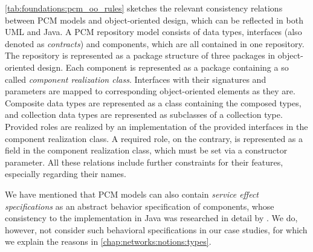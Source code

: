 \autoref{tab:foundations:pcm_oo_rules} sketches the relevant consistency relations between \gls{PCM} models and object-oriented design, which can be reflected in both \gls{UML} and Java.
A \gls{PCM} repository model consists of data types, interfaces (also denoted as \emph{contracts}) and components, which are all contained in one repository.
The repository is represented as a package structure of three packages in object-oriented design.
Each component is represented as a package containing a so called \emph{component realization class}.
Interfaces with their signatures and parameters are mapped to corresponding object-oriented elements as they are.
Composite data types are represented as a class containing the composed types, and collection data types are represented as subclasses of a collection type.
Provided roles are realized by an implementation of the provided interfaces in the component realization class.
A required role, on the contrary, is represented as a field in the component realization class, which must be set via a constructor parameter.
All these relations include further constraints for their features, especially regarding their names. %

We have mentioned that \gls{PCM} models can also contain \emph{service effect specifications} as an abstract behavior specification of components, whose consistency to the implementation in Java was researched in detail by \textcite{langhammer2017a}.
We do, however, not consider such behavioral specifications in our case studies, for which we explain the reasons in \autoref{chap:networks:notions:types}.

